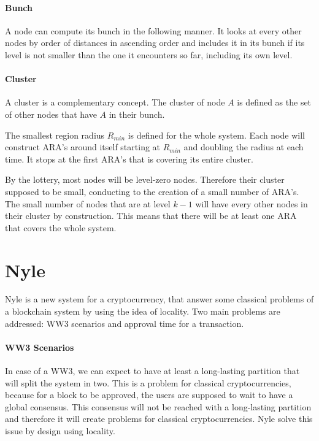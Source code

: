 \documentclass[a4paper,11pt,oneside]{report}
\begin{document}
\paragraph{Bunch} A node can compute its bunch in the following manner. It
looks at every other nodes by order of distances in ascending order and
includes it in its bunch if its level is not smaller than the one it encounters
so far, including its own level. 


\paragraph{Cluster} A cluster is a complementary concept. The cluster of node
$A$ is defined as the set of other nodes that have $A$ in their bunch. 

The smallest region radius $R_{min}$ is defined for the whole system. Each node
will construct ARA's around itself starting at $R_{min}$ and doubling the
radius at each time. It stops at the first ARA's that is covering its entire
cluster. 

By the lottery, most nodes will be level-zero nodes. Therefore their cluster
supposed to be small, conducting to the creation of a small number of ARA's.
The small number of nodes that are at level $k-1$ will have every other nodes
in their cluster by construction. This means that there will be at least one
ARA that covers the whole system. 

\section{Nyle}



Nyle is a new system for a cryptocurrency, that answer some classical problems
of a blockchain system by using the idea of locality. Two main problems are
addressed: WW3 scenarios and approval time for a transaction.
 
 \paragraph{WW3 Scenarios} \label{WW3} In case of a WW3, we can expect to have at least a
long-lasting partition that will split the system in two. This is a problem for
classical cryptocurrencies, because for a block to be approved, the users are
supposed to wait to have a global consensus. This consensus will not be reached
with a long-lasting partition and therefore it will create problems for
classical cryptocurrencies. Nyle solve this issue by design using locality.
\end{document}
